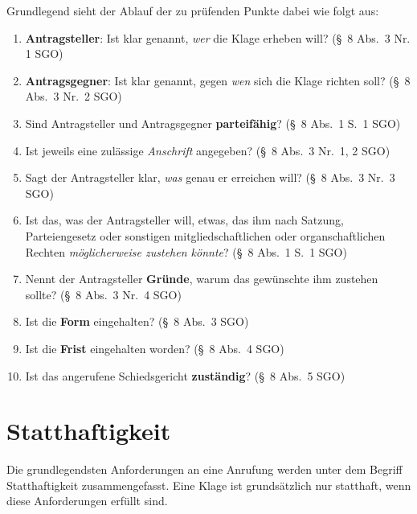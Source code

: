 Grundlegend sieht der Ablauf der zu prüfenden Punkte dabei wie folgt aus:
\begin{enumerate}[label=\Roman*.]
\item \textbf{Antragsteller}: Ist klar genannt, \emph{wer} die Klage erheben will? (\S~8 Abs.~3 Nr. 1 SGO)
\item \textbf{Antragsgegner}: Ist klar genannt, gegen \emph{wen} sich die Klage richten soll? (\S~8 Abs.~3 Nr.~2 SGO)
\item Sind Antragsteller und Antragsgegner \textbf{parteifähig}? (\S~8 Abs.~1 S.~1 SGO)
\item Ist jeweils eine zulässige \emph{Anschrift} angegeben? (\S~8 Abs.~3 Nr.~1, 2 SGO)
\item Sagt der Antragsteller klar, \emph{was} genau er erreichen will? (\S~8 Abs.~3 Nr.~3 SGO)
\item Ist das, was der Antragsteller will, etwas, das ihm nach Satzung, Parteiengesetz oder sonstigen mitgliedschaftlichen oder organschaftlichen Rechten \emph{möglicherweise zustehen könnte}? (\S~8 Abs.~1 S.~1 SGO)
\item Nennt der Antragsteller \textbf{Gründe}, warum das gewünschte ihm zustehen sollte? (\S~8 Abs.~3 Nr.~4 SGO)
\item Ist die \textbf{Form} eingehalten? (\S~8 Abs.~3 SGO)
\item Ist die \textbf{Frist} eingehalten worden? (\S~8 Abs.~4 SGO)
\item Ist das angerufene Schiedsgericht \textbf{zuständig}? (\S~8 Abs.~5 SGO)
\end{enumerate}

\section{Statthaftigkeit}
\label{Standardworkflow:Statthaftigkeit}
Die grundlegendsten Anforderungen an eine Anrufung werden unter dem Begriff Statthaftigkeit zusammengefasst.
Eine Klage ist grundsätzlich nur statthaft, wenn diese Anforderungen erfüllt sind.

